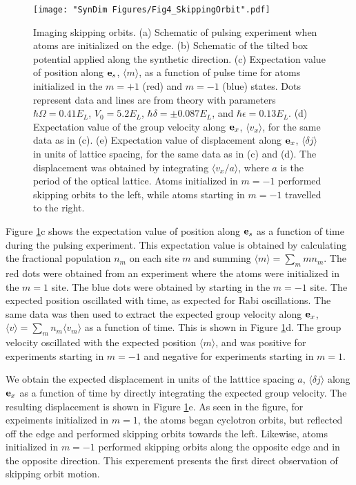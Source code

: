 \begin{figure}
	\texttt{[image: "SynDim Figures/Fig4\_SkippingOrbit".pdf]}
\caption[Imaging skipping orbits]{Imaging skipping orbits. (a) Schematic of pulsing experiment when atoms are initialized on the edge. (b) Schematic of the tilted box potential applied along the synthetic direction. (c) Expectation value of position along ${\bf e}_s$, $\langle m \rangle$, as a function of pulse time for atoms initialized in the $m=+1$ (red) and $m=-1$ (blue) states. Dots represent data and lines are from theory with parameters $\hbar\Omega=0.41 E_L$, $V_0=5.2 E_L$, $\hbar\delta=\pm0.087 E_L$, and $\hbar\epsilon=0.13 E_L$. (d) Expectation value of the group velocity along ${\bf e}_x$, $\langle v_x\rangle$, for the same data as in (c). (e) Expectation value of displacement along ${\bf e}_x$,  $\langle \delta j \rangle$ in units of lattice spacing, for the same data as in (c) and (d). The displacement was obtained by integrating $\langle v_x/a \rangle$, where $a$ is the period of the optical lattice. Atoms initialized in $m=-1$ performed skipping orbits to the left, while atoms starting in $m=-1$ travelled to the right.  }
\label{fig:skippingOrbits}
\end{figure}

Figure \ref{fig:skippingOrbits}c shows the expectation value of position along ${\bf e}_s$ as a function of time during the pulsing experiment. This expectation value is obtained by calculating the fractional population $n_m$ on each site $m$ and summing $\langle m\rangle = \sum_m m n_m$. The red dots were obtained from an experiment  where the atoms were initialized in the $m=1$ site. The blue dots were obtained by starting in the $m=-1$ site. The expected position oscillated with time, as expected for Rabi oscillations. The same data was then used to extract the expected group velocity along ${\bf e}_x$, $\langle v \rangle = \sum_m n_m \langle v_m \rangle$ as a function of time. This is shown in Figure \ref{fig:skippingOrbits}d. The group velocity oscillated with the expected position $\langle m \rangle$, and was positive for experiments starting in $m=-1$ and negative for experiments starting in $m=1$. 

We obtain the expected displacement in units of the latttice spacing $a$, $\langle \delta j \rangle$ along ${\bf e}_x$ as a function of time by directly integrating the expected group velocity. The resulting displacement is shown in Figure \ref{fig:skippingOrbits}e. As seen in the figure, for expeiments initialized in $m=1$, the atoms began cyclotron orbits, but reflected off the edge and performed skipping orbits towards the left. Likewise, atoms initialized in $m=-1$ performed skipping orbits along the opposite edge and in the opposite direction. This experement presents the first direct observation of skipping orbit motion. 
